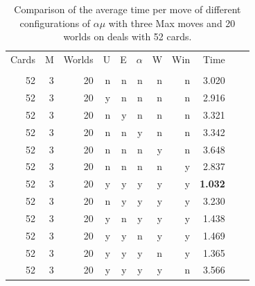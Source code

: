 \documentclass[letterpaper]{article} %
\begin{document}
\begin{table}
  \centering
  \caption{Comparison of the average time per move of different
  configurations of $\alpha\mu$ with three Max moves and 20 worlds on deals with 52 cards.}
  \label{tableTime-3-20-52}
  \begin{tabular}{rrrrrrrrrrr}
Cards & M & Worlds & U & E & $\alpha$ & W & Win &  Time\\
      &   &        &    &   &         &   &     &      \\
   52 & 3 &     20 &  n & n &       n & n &   n & 3.020\\
   52 & 3 &     20 &  y & n &       n & n &   n & 2.916\\
   52 & 3 &     20 &  n & y &       n & n &   n & 3.321\\
   52 & 3 &     20 &  n & n &       y & n &   n & 3.342\\
   52 & 3 &     20 &  n & n &       n & y &   n & 3.648\\
   52 & 3 &     20 &  n & n &       n & n &   y & 2.837\\
   52 & 3 &     20 &  y & y &       y & y &   y & \bf 1.032\\
   52 & 3 &     20 &  n & y &       y & y &   y & 3.230\\
   52 & 3 &     20 &  y & n &       y & y &   y & 1.438\\
   52 & 3 &     20 &  y & y &       n & y &   y & 1.469\\
   52 & 3 &     20 &  y & y &       y & n &   y & 1.365\\
   52 & 3 &     20 &  y & y &       y & y &   n & 3.566\\
  \end{tabular}
\end{table}
\end{document}
